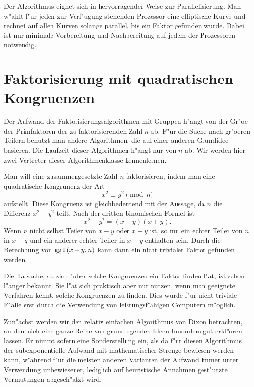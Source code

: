 Der Algorithmus eignet sich in hervorragender Weise zur
Parallelisierung. Man w"ahlt f"ur jeden zur Verf"ugung stehenden
Prozessor eine elliptische Kurve und rechnet auf allen Kurven solange
parallel, bis ein Faktor gefunden wurde. Dabei ist nur minimale
Vorbereitung und Nachbereitung auf jedem der Prozessoren notwendig.

\section{Faktorisierung mit quadratischen Kongruenzen}

Der Aufwand der Faktorisierungsalgorithmen mit Gruppen h"angt von der
Gr"o\3e der Primfaktoren der zu faktorisierenden Zahl $n$ ab.  F"ur
die Suche nach gr"o\3eren Teilern benutzt man andere Algorithmen, die
auf einer anderen Grundidee basieren. Die Laufzeit dieser Algorithmen
h"angt nur von $n$ ab.  Wir werden hier zwei Vertreter dieser
Algorithmenklasse kennenlernen.

Man will eine zusammengesetzte Zahl $n$ faktorisieren, indem man eine
quadratische Kongrunenz der Art
\begin{equation}
  x^2 \equiv y^2 \pmod{n} 
\end{equation}
aufstellt. Diese Kongruenz ist gleichbedeutend mit der Aussage, da\3
$n$ die Differenz $x^2 - y^2$ teilt. Nach der dritten binomischen
Formel ist
$$ x^2 - y^2 = (x-y)(x+y). $$ Wenn $n$ nicht selbst Teiler von $x-y$
oder $x+y$ ist, so mu\3 ein echter Teiler von $n$ in $x-y$ und ein
anderer echter Teiler in $x+y$ enthalten sein.  Durch die Berechnung
von $\mbox{ggT}(x+y,n)$ kann dann ein nicht trivialer Faktor gefunden
werden.

Die Tatsache, da\3 sich "uber solche Kongruenzen ein Faktor finden
l"a\3t, ist schon l"anger bekannt. Sie l"a\3t sich praktisch aber nur
nutzen, wenn man geeignete Verfahren kennt, solche Kongruenzen zu
finden. Dies wurde f"ur nicht triviale F"alle erst durch die
Verwendung von leistungsf"ahigen Computern m"oglich.

Zun"achst werden wir den relativ einfachen Algorithmus von Dixon
betrachten, an dem sich eine ganze Reihe von grundlegenden Ideen
besonders gut erkl"aren lassen.  Er nimmt sofern eine Sonderstellung
ein, als da\3 f"ur diesen Algorithmus der subexponentielle Aufwand mit
mathematischer Strenge bewiesen werden kann, w"ahrend f"ur die
meisten anderen Varianten der Aufwand immer unter Verwendung
unbewiesener, lediglich auf heuristische Annahmen gest"utzte
Vermutungen abgesch"atzt wird.

